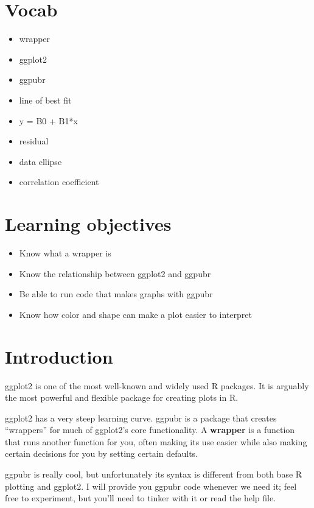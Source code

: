 \documentclass[
]{book}
\providecommand{\tightlist}{%
  \setlength{\itemsep}{0pt}\setlength{\parskip}{0pt}}
\begin{document}
\hypertarget{vocab-2}{%
\section{Vocab}\label{vocab-2}}

\begin{itemize}
\tightlist
\item
  wrapper
\item
  ggplot2
\item
  ggpubr
\item
  line of best fit
\item
  y = B0 + B1*x
\item
  residual
\item
  data ellipse
\item
  correlation coefficient
\end{itemize}

\hypertarget{learning-objectives-3}{%
\section{Learning objectives}\label{learning-objectives-3}}

\begin{itemize}
\tightlist
\item
  Know what a wrapper is
\item
  Know the relationship between ggplot2 and ggpubr
\item
  Be able to run code that makes graphs with ggpubr
\item
  Know how color and shape can make a plot easier to interpret
\end{itemize}

\hypertarget{introduction-5}{%
\section{Introduction}\label{introduction-5}}

ggplot2 is one of the most well-known and widely used R packages. It is arguably the most powerful and flexible package for creating plots in R.

ggplot2 has a very steep learning curve. ggpubr is a package that creates ``wrappers'' for much of ggplot2's core functionality. A \textbf{wrapper} is a function that runs another function for you, often making its use easier while also making certain decisions for you by setting certain defaults.

ggpubr is really cool, but unfortunately its syntax is different from both base R plotting and ggplot2. I will provide you ggpubr code whenever we need it; feel free to experiment, but you'll need to tinker with it or read the help file.
\end{document}
